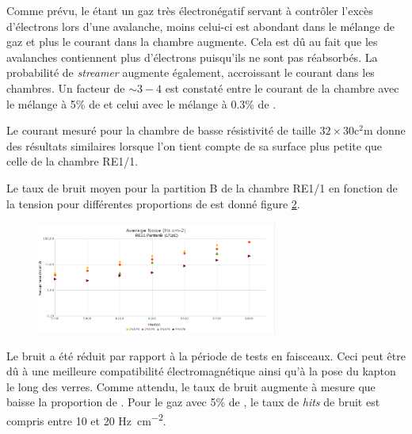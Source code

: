\begin{figure}[ht!]
	\centering
	\label{CurrentDOME}
\end{figure}

Comme prévu, le  étant un gaz très électronégatif servant à contrôler l'excès d'électrons lors d'une avalanche, moins celui-ci est abondant dans le mélange de gaz et plus le courant dans la chambre augmente. Cela est dû au fait que les avalanches contiennent plus d'électrons puisqu'ils ne sont pas réabsorbés. La probabilité de \textit{streamer} augmente également, accroissant le courant dans les chambres. Un facteur de $\sim 3-4$ est constaté entre le courant de la chambre avec le mélange à 5\% de  et celui avec le mélange à \num{0.3}\% de .

Le courant mesuré pour la chambre de basse résistivité de taille $\num{32}\times\num{30}\si{\square\centi\meter}$ donne des résultats similaires lorsque l'on tient compte de sa surface plus petite que celle de la chambre RE1/1.

\newpage
Le taux de bruit moyen pour la partition B de la chambre RE1/1 en fonction de la tension pour différentes proportions de  est donné figure \ref{bruitB}.

 
 \begin{figure}[ht!]
 	\centering
 	\includegraphics[width=0.705\textwidth]{GLA/NoisvsSF6.png}
 	\label{bruitB}
 \end{figure}
 
 Le bruit a été réduit par rapport à la période de tests en faisceaux. Ceci peut être dû à une meilleure compatibilité électromagnétique ainsi qu'à la pose du kapton le long des verres. Comme attendu, le taux de bruit augmente à mesure que baisse la proportion de . Pour le gaz avec 5\% de , le taux de \textit{hits} de bruit est compris entre \num{10} et \num{20} \si{\hertz\per\square\centi\meter}.
 

